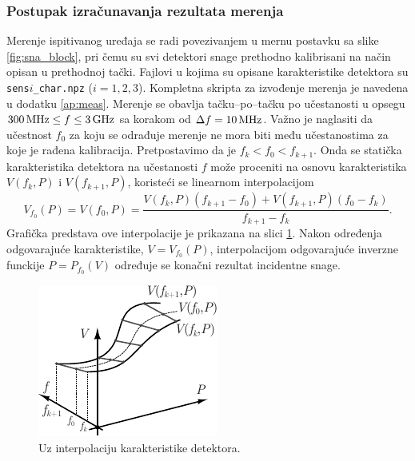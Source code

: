 \documentclass[a4paper, 12pt, diplomski]{etf}
\newcommand{\unit}[1]{\,{\rm #1}}
\begin{document}
\subsubsection{Postupak izračunavanja 
rezultata merenja}

Merenje ispitivanog uređaja se radi povezivanjem
u mernu postavku sa slike \ref{fig:sna_block},
pri čemu su svi detektori snage prethodno
kalibrisani na način opisan u prethodnoj tački.
Fajlovi u kojima su opisane karakteristike 
detektora su \verb|sens|$i$\verb|_char.npz| 
($i = 1,2,3$). Kompletna skripta za izvođenje
merenja je navedena u dodatku \ref{ap:meas}. 
Merenje se obavlja tačku--po--tačku po učestanosti u opsegu
$300\unit{MHz} \leq f \leq 3\unit{GHz}$ sa korakom od $\Delta f = 10\unit{MHz}$. Važno je naglasiti da učestnost $f_0$
za koju se odrađuje merenje ne mora biti među učestanostima za koje
je rađena kalibracija. Pretpostavimo da je $f_{k} < f_0 < f_{k+1}$.
Onda se statička karakteristika detektora na učestanosti $f$ može 
proceniti na osnovu karakteristika $V(f_k, P)$ i $V(f_{k+1}, P)$,
koristeći se linearnom interpolacijom
\begin{equation}
    V_{f_0}(P) = V(f_0, P) = \dfrac{ V(f_k, P)(f_{k+1} - f_0) + 
    V(f_{k+1}, P)(f_{0} - f_k)  }{f_{k+1} - f_k}.
\end{equation}
Grafička predstava ove interpolacije je prikazana na slici
\ref{fig:interp}.
Nakon određenja odgovarajuće karakteristike, $V = V_{f_0}(P)$, 
interpolacijom odgovarajuće inverzne funckije $P = P_{f_0}(V)$
određuje se konačni rezultat incidentne snage.

\begin{figure}[ht!]
    \centering
    \includegraphics[scale=1.4
    ]{fig/3dinterp.pdf}
    \caption{Uz interpolaciju karakteristike detektora.}
    \label{fig:interp}
\end{figure}
\end{document}
